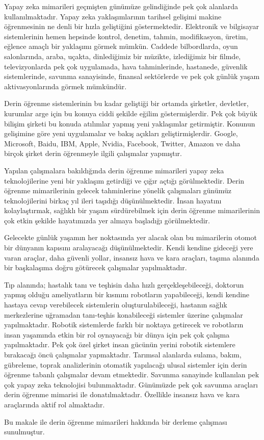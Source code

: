 \documentclass{article}
\begin{document}
\begin{multicols}{2}
Yapay zeka mimarileri geçmişten günümüze
gelindiğinde pek çok alanlarda kullanılmaktadır.
Yapay zeka yaklaşımlarının tarihsel gelişimi
makine öğrenmesinin ne denli bir hızla
geliştiğini göstermektedir. Elektronik ve
bilgisayar sistemlerinin hemen hepsinde kontrol,
denetim, tahmin, modifikasyon, üretim, eğlence
amaçlı bir yaklaşımı görmek mümkün. Caddede
bilbordlarda, oyun salonlarında, araba, uçakta,
dinlediğimiz bir müzikte, izlediğimiz bir filmde,
televizyonlarda pek çok uygulamada, hava
tahminlerinde, hastanede, güvenlik
sistemlerinde, savunma sanayisinde, finansal sektörlerde ve pek çok günlük yaşam aktivasyonlarında görmek mümkündür. 

Derin öğrenme sistemlerinin bu kadar geliştiği
bir ortamda şirketler, devletler, kurumlar arge
için bu konuya ciddi şekilde eğilim
göstermişlerdir. Pek çok büyük bilişim şirketi bu
konuda atılımlar yapmış yeni yaklaşımlar
getirmiştir. Konunun gelişimine göre yeni
uygulamalar ve bakış açıkları geliştirmişlerdir.
Google, Microsoft, Baidu, IBM, Apple, Nvidia,
Facebook, Twitter, Amazon ve daha birçok şirket
derin öğrenmeyle ilgili çalışmalar yapmıştır. 

Yapılan çalışmalara bakıldığında derin öğrenme
mimarileri yapay zeka teknolojilerine yeni bir
yaklaşım getirdiği ve çığır açtığı görülmektedir.
Derin öğrenme mimarilerinin gelecek
tahminlerine yönelik çalışmaları günümüz
teknolojilerini birkaç yıl ileri taşıdığı
düşünülmektedir. İnsan hayatını kolaylaştırmak,
sağlıklı bir yaşam sürdürebilmek için derin
öğrenme mimarilerinin çok etkin şekilde
hayatımızda yer almaya başladığı görülmektedir.

Gelecekte günlük yaşamın her noktasında yer
alacak olan bu mimarilerin otomot bir dünyanın
kapısını aralayacağı düşünülmektedir. Kendi
kendine gideceği yere varan araçlar, daha güvenli
yollar, insansız hava ve kara araçları, taşıma
alanında bir başkalaşıma doğru götürecek
çalışmalar yapılmaktadır.

\newpage 
 Tıp alanında; hastalık
tanı ve teşhisin daha hızlı gerçekleşebileceği,
doktorun yapmış olduğu ameliyatların bir
kısmını robotların yapabileceği, kendi kendine
hastaya cevap verebilecek sistemlerin
oluşturulabileceği, hastanın sağlık merkezlerine
uğramadan tanı-teşhis konabileceği sistemler
üzerine çalışmalar yapılmaktadır. Robotik sistemlerde farklı bir noktaya getirecek
ve robotların insan yaşamında etkin bir rol
oynayacağı bir dünya için pek çok çalışma
yapılmaktadır. Pek çok özel şirket insan gücünün
yerini robotik sistemlere bırakacağı öncü
çalışmalar yapmaktadır. Tarımsal alanlarda
sulama, bakım, gübreleme, toprak analizlerinin otomatik yapılacağı ulusal sistemler için derin
öğrenme tabanlı çalışmalar devam etmektedir.
Savunma sanayinde kullanılan pek çok yapay
zeka teknolojisi bulunmaktadır.
Günümüzde pek
çok savunma araçları derin öğrenme mimarisi ile
donatılmaktadır. Özellikle insansız hava ve kara
araçlarında aktif rol almaktadır.

Bu makale ile derin öğrenme mimarileri
hakkında bir derleme çalışması sunulmuştur.
\end{multicols}
\end{document}
